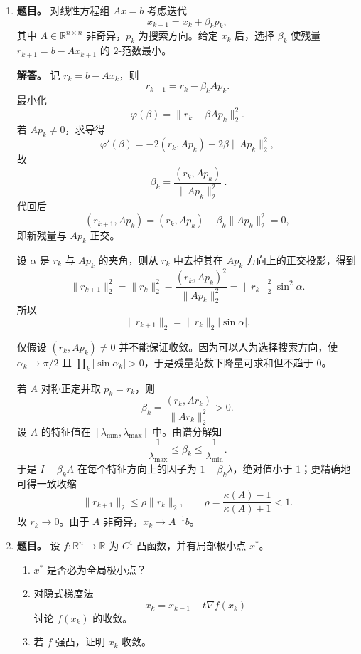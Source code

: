 ﻿\documentclass[UTF8,12pt]{ctexart}
\begin{document}
\begin{enumerate}[label=\textbf{\arabic*.},leftmargin=2.2em]
由 Hadamard 不等式，每个 \(r\times r\) 子式的绝对值不超过
\[
(\sqrt r H)^r\le (nH)^n.
\]
\(\operatorname{adj}(C)d\) 的每个分量也是一个 \(r\times r\) 子式，故所有坐标都由同一数量级控制。于是
\[
\|x\|_\infty\le (nH)^n\le(2nH)^n.
\]
这给出了题目要求的“合理小”的整数零空间向量。

\item \textbf{题目。} 对线性方程组 \(Ax=b\) 考虑迭代
\[
x_{k+1}=x_k+\beta_k p_k,
\]
其中 \(A\in\mathbb R^{n\times n}\) 非奇异，\(p_k\) 为搜索方向。给定 \(x_k\) 后，选择 \(\beta_k\) 使残量 \(r_{k+1}=b-Ax_{k+1}\) 的 \(2\)-范数最小。

\textbf{解答。} 记 \(r_k=b-Ax_k\)，则
\[
r_{k+1}=r_k-\beta_k A p_k.
\]
最小化
\[
\varphi(\beta)=\|r_k-\beta A p_k\|_2^2.
\]
若 \(Ap_k\ne0\)，求导得
\[
\varphi'(\beta)=-2(r_k,Ap_k)+2\beta\|Ap_k\|_2^2,
\]
故
\[
\boxed{\ \beta_k=\frac{(r_k,Ap_k)}{\|Ap_k\|_2^2}\ }.
\]
代回后
\[
(r_{k+1},Ap_k)=(r_k,Ap_k)-\beta_k\|Ap_k\|_2^2=0,
\]
即新残量与 \(Ap_k\) 正交。

设 \(\alpha\) 是 \(r_k\) 与 \(Ap_k\) 的夹角，则从 \(r_k\) 中去掉其在 \(Ap_k\) 方向上的正交投影，得到
\[
\|r_{k+1}\|_2^2
=\|r_k\|_2^2-\frac{(r_k,Ap_k)^2}{\|Ap_k\|_2^2}
=\|r_k\|_2^2\sin^2\alpha.
\]
所以
\[
\|r_{k+1}\|_2=\|r_k\|_2|\sin\alpha|.
\]

仅假设 \((r_k,Ap_k)\ne0\) 并不能保证收敛。因为可以人为选择搜索方向，使 \(\alpha_k\to\pi/2\) 且 \(\prod_k|\sin\alpha_k|>0\)，于是残量范数下降量可求和但不趋于 \(0\)。

若 \(A\) 对称正定并取 \(p_k=r_k\)，则
\[
\beta_k=\frac{(r_k,Ar_k)}{\|Ar_k\|_2^2}>0.
\]
设 \(A\) 的特征值在 \([\lambda_{\min},\lambda_{\max}]\) 中。由谱分解知
\[
\frac1{\lambda_{\max}}\le \beta_k\le \frac1{\lambda_{\min}}.
\]
于是 \(I-\beta_k A\) 在每个特征方向上的因子为 \(1-\beta_k\lambda\)，绝对值小于 \(1\)；更精确地可得一致收缩
\[
\|r_{k+1}\|_2\le \rho\|r_k\|_2,\qquad
\rho=\frac{\kappa(A)-1}{\kappa(A)+1}<1.
\]
故 \(r_k\to0\)。由于 \(A\) 非奇异，\(x_k\to A^{-1}b\)。

\item \textbf{题目。} 设 \(f:\mathbb R^n\to\mathbb R\) 为 \(C^1\) 凸函数，并有局部极小点 \(x^\ast\)。
\begin{enumerate}[label=(\arabic*),leftmargin=2em]
\item \(x^\ast\) 是否必为全局极小点？
\item 对隐式梯度法
\[
x_k=x_{k-1}-t\nabla f(x_k)
\]
讨论 \(f(x_k)\) 的收敛。
\item 若 \(f\) 强凸，证明 \(x_k\) 收敛。
\end{enumerate}


\end{enumerate}
\end{document}
